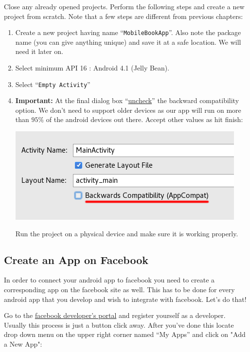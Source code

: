 Close any already opened projects. Perform the following steps and create a new project from scratch. Note that a few steps are different from previous chapters:
\begin{enumerate}
	\item Create a new project having name ``\texttt{MobileBookApp}''. Also note the package name (you can give anything unique) and save it at a safe location. We will need it later on.
	\item Select minimum API 16 : Android 4.1 (Jelly Bean).
	\item Select ``\texttt{Empty Activity}''
	\item \textbf{Important:} At the final dialog box ``\underline{uncheck}'' the backward compatibility option. We don't need to support older devices as our app will run on more than $95\%$ of the android devices out there. Accept other values as hit finish:
	
	\begin{center}
		\includegraphics[scale=\SourceCodeScale]{chapters/ch12/images/1}
	\end{center}
	
	Run the project on a physical device and make sure it is working properly.
\end{enumerate}	

\subsection{Create an App on Facebook}
\label{FBI:createApponFacebook}
In order to connect your android app to facebook you need to create a corresponding app on the facebook site as well. This has to be done for every android app that you develop and wish to integrate with facebook. Let's do that!

Go to the \href{https://developers.facebook.com/}{facebook developer's portal} and register yourself as a developer. Usually this process is just a button click away. After you've done this locate drop down menu on the upper right corner named ``My Apps'' and click on "Add a New App":

